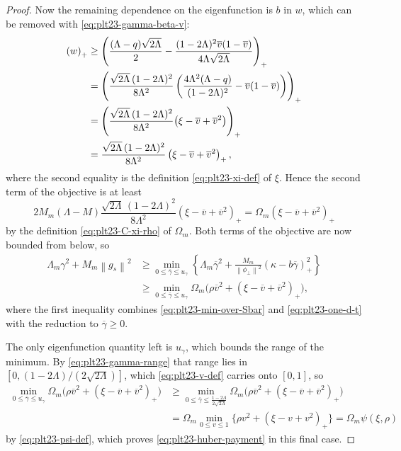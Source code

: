 \documentclass[11pt]{article}
\numberwithin{equation}{section}
\newcommand{\norm}[1]{\left\lVert #1\right\rVert}
\newcommand{\pos}[1]{\left(#1\right)_{+}}
\begin{document}
\begin{proof}
  Now the remaining dependence on the eigenfunction is $b$ in $w$, which can be removed with \eqref{eq:plt23-gamma-beta-v}:
  \begin{align}
    \pos w
    &\ge\pos{\frac{(\Lambda-q)\sqrt{2\Lambda}}{2}
    -\frac{(1-2\Lambda)^2\overline v(1-\overline v)}{4\Lambda\sqrt{2\Lambda}}}\notag\\
    &=\pos{\frac{\sqrt{2\Lambda}\,(1-2\Lambda)^2}{8\Lambda^2}
    \left(\frac{4\Lambda^2(\Lambda-q)}{(1-2\Lambda)^2}-\overline v(1-\overline v)\right)}\notag\\
    &=\pos{\frac{\sqrt{2\Lambda}\,(1-2\Lambda)^2}{8\Lambda^2}
    \bigl(\xi-\overline v+\overline v^2\bigr)}\notag\\
    &=\frac{\sqrt{2\Lambda}\,(1-2\Lambda)^2}{8\Lambda^2}
    \pos{\xi-\overline v+\overline v^2},\label{eq:plt23-one-d-gamma}
  \end{align}
  where the second equality is the definition \eqref{eq:plt23-xi-def} of $\xi$.
  Hence the second term of the objective is at least
  \[
    2M_m(\Lambda-M)\frac{\sqrt{2\Lambda}\,(1-2\Lambda)^2}{8\Lambda^2}
    \pos{\xi-\overline v+\overline v^2}
    =\Omega_m\pos{\xi-\overline v+\overline v^2}
  \]
  by the definition \eqref{eq:plt23-C-xi-rho} of $\Omega_m$.
  Both terms of the objective are now bounded from below, so
  \begin{align*}
    \Lambda_m\gamma^2+M_m\norm{g_s}^2
    &\ge\min_{0\le\overline\gamma\le u_\gamma}
    \left\{
    \Lambda_m\overline\gamma^2
    +\frac{M_m}{\norm{\phi_\perp}^2}\pos{\kappa-b\overline\gamma}^2
    \right\}\\
    &\ge\min_{0\le\overline\gamma\le u_\gamma}
    \Omega_m\bigl(\rho\overline v^2+\pos{\xi-\overline v+\overline v^2}\bigr),
  \end{align*}
  where the first inequality combines \eqref{eq:plt23-min-over-Sbar} and \eqref{eq:plt23-one-d-t} with the reduction to $\overline\gamma\ge0$.

  The only eigenfunction quantity left is $u_\gamma$, which bounds the range of the minimum.
  By \eqref{eq:plt23-gamma-range} that range lies in $[0,(1-2\Lambda)/(2\sqrt{2\Lambda})]$, which \eqref{eq:plt23-v-def} carries onto $[0,1]$, so
  \begin{align*}
    \min_{0\le\overline\gamma\le u_\gamma}
    \Omega_m\bigl(\rho\overline v^2+\pos{\xi-\overline v+\overline v^2}\bigr)
    &\ge\min_{0\le\overline\gamma\le\frac{1-2\Lambda}{2\sqrt{2\Lambda}}}
    \Omega_m\bigl(\rho\overline v^2+\pos{\xi-\overline v+\overline v^2}\bigr)\\
    &=\Omega_m\min_{0\le v\le1}
    \bigl\{\rho v^2+\pos{\xi-v+v^2}\bigr\}
    =\Omega_m\psi(\xi,\rho)
  \end{align*}
  by \eqref{eq:plt23-psi-def}, which proves \eqref{eq:plt23-huber-payment} in this final case.
\end{proof}
\end{document}
